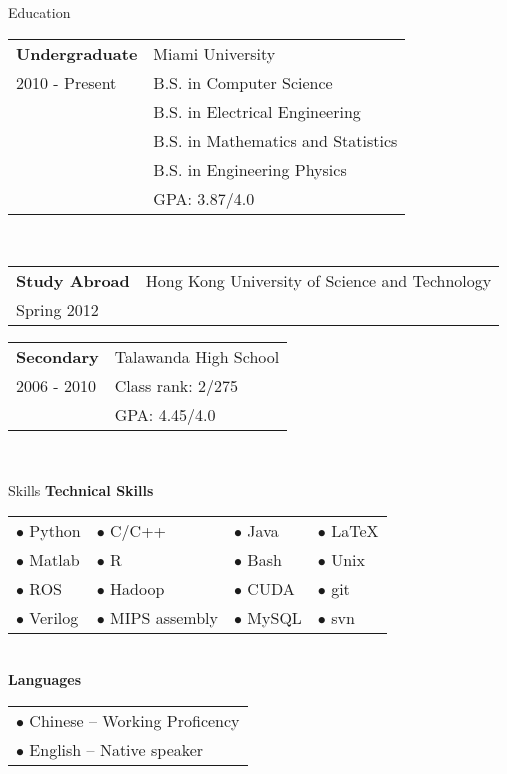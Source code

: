 \documentclass{resume} %
\begin{document}
\begin{rSection}{Education}


  \begin{tabular}{ll}
    \textbf{Undergraduate}    & Miami University \\
    2010 - Present   & B.S. in Computer Science \\
    & B.S. in Electrical Engineering \\
    & B.S. in Mathematics and Statistics \\
    & B.S. in Engineering Physics \\
    & GPA: 3.87/4.0 \\
  \end{tabular} \\
  \begin{tabular}{ll}
    \textbf{Study Abroad}    &   Hong Kong University of Science and Technology \\
    Spring 2012 \\
  \end{tabular}

  \begin{tabular}{ll}
    \textbf{Secondary}    & Talawanda High School \\
    2006 - 2010           & Class rank: 2/275 \\
    &GPA: 4.45/4.0 \\
  \end{tabular} \\
\end{rSection}
\begin{rSection}{Skills}
  \textbf{Technical Skills}\\[1 mm]
  \begin{tabular}{llll}
     $\bullet$ Python   &  $\bullet$ C/C++         &  $\bullet$ Java   &   $\bullet$ \LaTeX\\
     $\bullet$ Matlab   &  $\bullet$ R             &  $\bullet$ Bash   &   $\bullet$ Unix \\ 
     $\bullet$ ROS      &  $\bullet$ Hadoop        &  $\bullet$ CUDA   &   $\bullet$ git\\
     $\bullet$ Verilog  &  $\bullet$ MIPS assembly &  $\bullet$ MySQL  &   $\bullet$ svn\\
  \end{tabular}\\[1 mm]
  \textbf{Languages}\\[1 mm]
  \begin{tabular}{l}
    $\bullet$ Chinese --  Working Proficency\\
    $\bullet$ English --  Native speaker
  \end{tabular}
\end{rSection}
\end{document}
